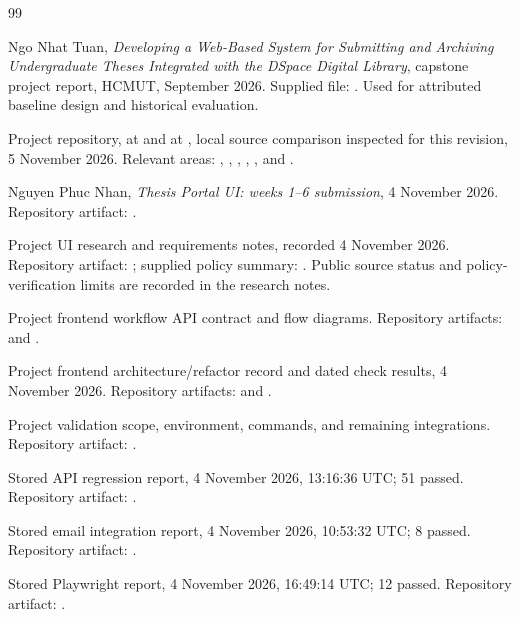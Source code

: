 \documentclass[11pt,a4paper]{report}
\newcommand{\code}[1]{{\small\texttt{\detokenize{#1}}}}
\begin{document}
\begin{thebibliography}{99}

Ngo Nhat Tuan, \emph{Developing a Web-Based System for Submitting and Archiving Undergraduate Theses Integrated with the DSpace Digital Library}, capstone project report, HCMUT, September 2026. Supplied file: . Used for attributed baseline design and historical evaluation.

Project repository, \code{main} at \code{4f7a73df} and \code{UI-build} at \code{3d97faf3}, local source comparison inspected for this revision, 5 November 2026. Relevant areas: , , , , , and .

Nguyen Phuc Nhan, \emph{Thesis Portal UI: weeks 1--6 submission}, 4 November 2026. Repository artifact: .

Project UI research and requirements notes, recorded 4 November 2026. Repository artifact: ; supplied policy summary: . Public source status and policy-verification limits are recorded in the research notes.

Project frontend workflow API contract and flow diagrams. Repository artifacts:  and .

Project frontend architecture/refactor record and dated check results, 4 November 2026. Repository artifacts:  and .

Project validation scope, environment, commands, and remaining integrations. Repository artifact: .

Stored API regression report, 4 November 2026, 13:16:36 UTC; 51 passed. Repository artifact: .

Stored email integration report, 4 November 2026, 10:53:32 UTC; 8 passed. Repository artifact: .

Stored Playwright report, 4 November 2026, 16:49:14 UTC; 12 passed. Repository artifact: .


\end{thebibliography}
\end{document}
